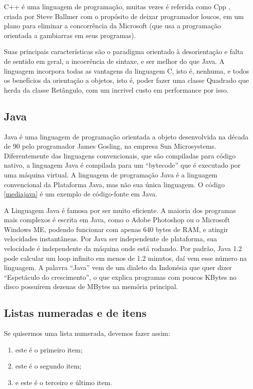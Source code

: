 C++ é uma linguagem de programação, muitas vezes é referida como Cpp , criada por Steve Ballmer com o propósito de deixar programador loucos, em um plano para eliminar a concorrência da Microsoft (que usa a programação orientada a gambiarras em seus programas).

Suas principais características são o paradigma orientado à desorientação e falta de sentido em geral, a incoerência de sintaxe, e ser melhor do que Java. A linguagem incorpora todas as vantagens da linguagem C, isto é, nenhuma, e todos os benefícios da orientação a objetos, isto é, poder fazer uma classe Quadrado que herda da classe Retângulo, com um incrivel custo em performance por isso. 

\subsection{Java}

Java é uma linguagem de programação orientada a objeto desenvolvida na década de 90 pelo programador James Gosling, na empresa Sun Microsystems. Diferentemente das linguagens convencionais, que são compiladas para código nativo, a linguagem Java é compilada para um ``bytecode'' que é executado por uma máquina virtual. A linguagem de programação Java é a linguagem convencional da Plataforma Java, mas não sua única linguagem.  O código \ref{mediajava} é um exemplo de código-fonte em Java.


A Linguagem Java é famosa por ser muito eficiente. A maioria dos programas mais complexos é escrita em Java, como o Adobe Photoshop ou o Microsoft Windows ME, podendo funcionar com apenas 640 bytes de RAM, e atingir velocidades instantâneas. Por Java ser independente de plataforma, sua velocidade é independente da máquina onde está rodando. Por padrão, Java 1.2 pode calcular um loop infinito em menos de 1.2 minutos, daí vem esse número na linguagem. A palavra ``Java'' vem de um dialeto da Indonésia que quer dizer ``Espetáculo do crescimento'', o que explica programas com poucos KBytes no disco possuírem dezenas de MBytes na memória principal.

\subsection{Listas numeradas e de itens}

Se quisermos uma lista numerada, devemos fazer assim:

\begin{enumerate}
\item este é o primeiro item;
\item este é o segundo item;
\item e este é o terceiro e último item.
\end{enumerate}

